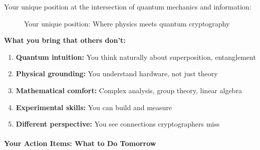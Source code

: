 \documentclass[11pt,a4paper]{article}
\begin{document}
Your unique position at the intersection of quantum mechanics and information:

\begin{figure}[h]
\centering
{}
\caption{Your unique position: Where physics meets quantum cryptography}
\end{figure}

\textbf{What you bring that others don't:}
\begin{enumerate}
    \item \textbf{Quantum intuition:} You think naturally about superposition, entanglement
    \item \textbf{Physical grounding:} You understand hardware, not just theory
    \item \textbf{Mathematical comfort:} Complex analysis, group theory, linear algebra
    \item \textbf{Experimental skills:} You can build and measure
    \item \textbf{Different perspective:} You see connections cryptographers miss
\end{enumerate}

\paragraph{Your Action Items: What to Do Tomorrow}
\end{document}
